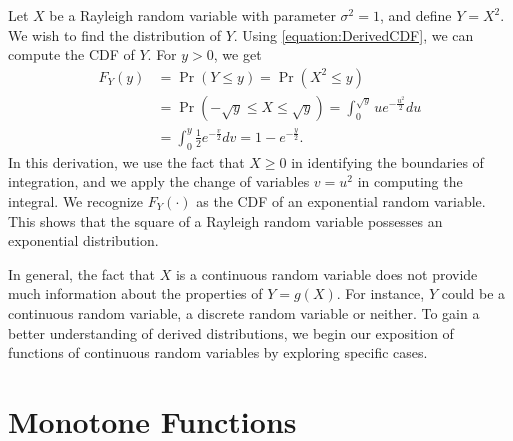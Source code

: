 \begin{example} \label{example:RayleighExponentialRV}
Let $X$ be a Rayleigh  random variable with parameter $\sigma^2  = 1$, and define $Y = X^2$.
We wish to find the distribution of $Y$.
Using \eqref{equation:DerivedCDF}, we can compute the CDF of $Y$.
For $y > 0$, we get
\begin{equation*}
\begin{split}
F_Y(y) &= \Pr (Y \leq y) = \Pr \left( X^2 \leq y \right) \\
&= \Pr (- \sqrt{y} \leq X \leq \sqrt{y})
= \int_0^{\sqrt{y}} u e^{- \frac{u^2}{2}} du \\
&= \int_0^{y} \frac{1}{2} e^{- \frac{v}{2}} dv
= 1 - e^{-\frac{y}{2}} .
\end{split}
\end{equation*}
In this derivation, we use the fact that $X \geq 0$ in identifying the boundaries of integration, and we apply the change of variables $v = u^2$ in computing the integral.
We recognize $F_Y(\cdot)$ as the CDF of an exponential random variable.
This shows that the square of a Rayleigh random variable possesses an exponential distribution.
\end{example}

In general, the fact that $X$ is a continuous random variable does not provide much information about the properties of $Y = g(X)$.
For instance, $Y$ could be a continuous random variable, a discrete random variable or neither.
To gain a better understanding of derived distributions, we begin our exposition of functions of continuous random variables by exploring specific cases.


\section{Monotone Functions}


